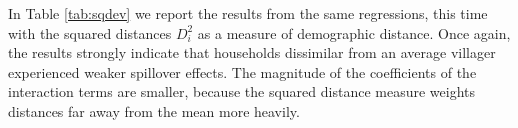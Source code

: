 \documentclass[11pt]{article}
\begin{document}
    In Table \ref{tab:sqdev} we report the results from the same regressions, this time with the squared distances $D_i^2$ as a measure of demographic distance. Once again, the results strongly indicate that households dissimilar from an average villager experienced weaker spillover effects. The magnitude of the coefficients of the interaction terms are smaller, because the squared distance measure weights distances far away from the mean more heavily.


\end{document}
